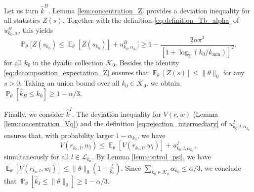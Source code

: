 \documentclass[twoside,11pt]{article}
\def\cK{\mathcal{K}}
\def\cL{\mathcal{L}}
\newcommand{\E}{\operatorname{\mathbb{E}}}
\renewcommand{\P}{\operatorname{\mathbb{P}}}
\newcommand{\<}{\langle}
\renewcommand{\>}{\rangle}
\begin{document}
Let us turn $\widehat{k}^{B}$. Lemma \ref{lem:concentration_Z} provides a deviation inequality for all statistics $Z(s)$. Together with the definition \eqref{eq:definition_Tb_alpha} of $u_{k_0,\alpha}^B$, this yields
\[
  \P_{\theta}\big[Z(s_{k_0})\leq \E_{\theta}[Z(s_{k_0})] + u_{k_0,\alpha_{k_0}}^B \big]\geq 1 - \frac{2\alpha \pi^2}{[1+\log_2(k_0/k_{\min})]^2},
\]
for all $k_0$ in the dyadic collection $\cK_0$. Besides the identity \eqref{eq:decomposition_expectation_Z} ensures that $\E_{\theta}[Z(s)]\leq \|\theta\|_0$ for any $s>0$. Taking an union bound over all $k_0\in \cK_0$, we obtain $\P_{\theta}[\widehat{k}_B\leq k_0]\geq 1-\alpha/3$.



Finally, we consider $\widehat{k}^I$. The deviation inequality for $V(r,w)$ (Lemma \ref{lem:concentration_Vq}) and the definition \eqref{eq:rejection_intermediary} of $u^I_{k_0,l,\alpha_{k_0}}$ ensures that, with probability larger $1-\alpha_{k_0}$, we have
\[
 V(r_{k_0,l},w_l)\leq \E_{\theta}[V(r_{k_0,l},w_l)]+ u^I_{k_0,l,\alpha_{k_0}},
\]
simultaneously for all $l\in \cL_{k_0}$. By Lemma \ref{lem:control_psi}, we have $\E_{\theta}[V(r_{k_0,l},w_l)]\leq \|\theta\|_0(1+\frac{l}{k_0})$. Since $\sum_{k_0\in \cK_0}\alpha_{k_0}\leq \alpha/3$, we conclude that $\P_{\theta}[\widehat{k}_I\leq \|\theta\|_0]\geq 1- \alpha/3$.



 \bigskip 
 
\end{document}
